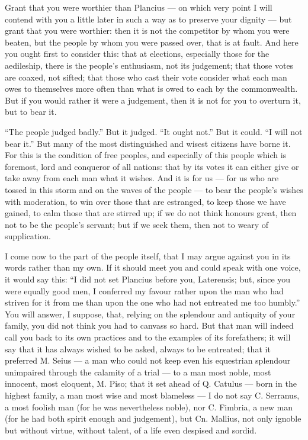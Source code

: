 Grant that you were worthier than Plancius --- on which very point I will contend with you a little later in such a way as to preserve your dignity --- but grant that you were worthier: then it is not the competitor by whom you were beaten, but the people by whom you were passed over, that is at fault. And here you ought first to consider this: that at elections, especially those for the aedileship, there is the people's enthusiasm, not its judgement; that those votes are coaxed, not sifted; that those who cast their vote consider what each man owes to themselves more often than what is owed to each by the commonwealth. But if you would rather it were a judgement, then it is not for you to overturn it, but to bear it.

 ``The people judged badly.'' But it judged. ``It ought not.'' But it could. ``I will not bear it.'' But many of the most distinguished and wisest citizens have borne it. For this is the condition of free peoples, and especially of this people which is foremost, lord and conqueror of all nations: that by its votes it can either give or take away from each man what it wishes. And it is for us --- for us who are tossed in this storm and on the waves of the people --- to bear the people's wishes with moderation, to win over those that are estranged, to keep those we have gained, to calm those that are stirred up; if we do not think honours great, then not to be the people's servant; but if we seek them, then not to weary of supplication.

 I come now to the part of the people itself, that I may argue against you in its words rather than my own. If it should meet you and could speak with one voice, it would say this: ``I did not set Plancius before you, Laterensis; but, since you were equally good men, I conferred my favour rather upon the man who had striven for it from me than upon the one who had not entreated me too humbly.'' You will answer, I suppose, that, relying on the splendour and antiquity of your family, you did not think you had to canvass so hard. But that man will indeed call you back to its own practices and to the examples of its forefathers; it will say that it has always wished to be asked, always to be entreated; that it preferred M. Seius --- a man who could not keep even his equestrian splendour unimpaired through the calamity of a trial --- to a man most noble, most innocent, most eloquent, M. Piso; that it set ahead of Q. Catulus --- born in the highest family, a man most wise and most blameless --- I do not say C. Serranus, a most foolish man (for he was nevertheless noble), nor C. Fimbria, a new man (for he had both spirit enough and judgement), but Cn. Mallius, not only ignoble but without virtue, without talent, of a life even despised and sordid.

